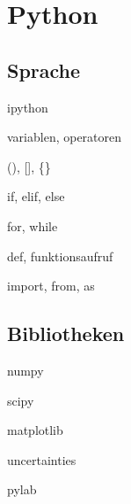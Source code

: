 \documentclass[t]{beamer}
\begin{document}
  \section{Python}
    \begin{frame}
    \end{frame}
    \subsection{Sprache}
      \begin{frame}{ipython}
      \end{frame}
      \begin{frame}{variablen, operatoren}
      \end{frame}
      \begin{frame}{(), [], \{\}}
      \end{frame}
      \begin{frame}{if, elif, else}
      \end{frame}
      \begin{frame}{for, while}
      \end{frame}
      \begin{frame}{def, funktionsaufruf}
      \end{frame}
      \begin{frame}{import, from, as}
      \end{frame}
    \subsection{Bibliotheken}
      \begin{frame}{numpy}
      \end{frame}
      \begin{frame}{scipy}
      \end{frame}
      \begin{frame}{matplotlib}
      \end{frame}
      \begin{frame}{uncertainties}
      \end{frame}
      \begin{frame}{pylab}
      \end{frame}
\end{document}

